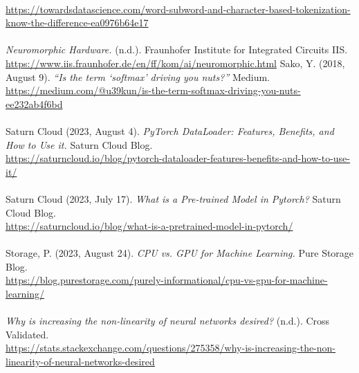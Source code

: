 \documentclass{article}
\begin{document}
\\
\url{https://towardsdatascience.com/word-subword-and-character-based-tokenization-know-the-difference-ea0976b64e17}
\\\\
\textit{Neuromorphic Hardware.} (n.d.). Fraunhofer Institute for Integrated Circuits IIS.
\\
\url{https://www.iis.fraunhofer.de/en/ff/kom/ai/neuromorphic.html}
\newpage
Sako, Y. (2018, August 9). \textit{“Is the term ‘softmax’ driving you nuts?”} Medium.
\\
\url{https://medium.com/@u39kun/is-the-term-softmax-driving-you-nuts-ee232ab4f6bd}
\\\\
Saturn Cloud (2023, August 4). \textit{PyTorch DataLoader: Features, Benefits, and How to Use it.} Saturn Cloud Blog.
\\
\url{https://saturncloud.io/blog/pytorch-dataloader-features-benefits-and-how-to-use-it/}
\\\\
Saturn Cloud (2023, July 17). \textit{What is a Pre-trained Model in Pytorch?} Saturn Cloud Blog.
\\
\url{https://saturncloud.io/blog/what-is-a-pretrained-model-in-pytorch/}
\\\\
Storage, P. (2023, August 24). \textit{CPU vs. GPU for Machine Learning.} Pure Storage Blog.
\\
\url{https://blog.purestorage.com/purely-informational/cpu-vs-gpu-for-machine-learning/}
\\\\
\textit{Why is increasing the non-linearity of neural networks desired?} (n.d.). Cross Validated.
\\
\url{https://stats.stackexchange.com/questions/275358/why-is-increasing-the-non-linearity-of-neural-networks-desired}
\end{document}
